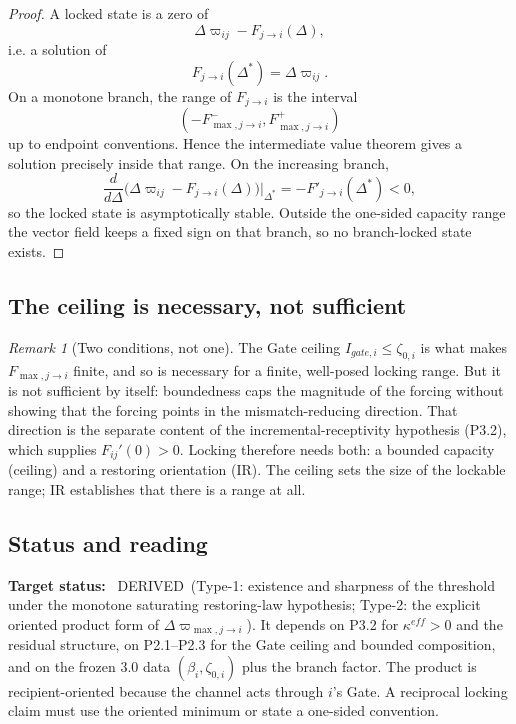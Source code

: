 \documentclass[11pt,a4paper]{article}
\def\mathrm#1{#1}%
\def\emph#1{#1}%
\newcommand{\stDerived}{\textcolor{cDer}{\textsf{\small DERIVED}}}
\theoremstyle{definition}
\theoremstyle{plain}
\theoremstyle{remark}
\newtheorem{remark}[definition]{Remark}
\begin{document}
\begin{proof}
A locked state is a zero of
\[
\Delta\varpi_{ij}-F_{j\to i}(\Delta),
\]
i.e. a solution of
\[
F_{j\to i}(\Delta^*)=\Delta\varpi_{ij}.
\]
On a monotone branch, the range of \(F_{j\to i}\) is the interval
\[
(-F^-_{\max,j\to i},F^+_{\max,j\to i})
\]
up to endpoint conventions. Hence the intermediate value theorem gives a solution
precisely inside that range. On the increasing branch,
\[
\frac{d}{d\Delta}
\bigl(\Delta\varpi_{ij}-F_{j\to i}(\Delta)\bigr)\big|_{\Delta^*}
=
-F'_{j\to i}(\Delta^*)<0,
\]
so the locked state is asymptotically stable. Outside the one-sided capacity
range the vector field keeps a fixed sign on that branch, so no branch-locked
state exists. \qedhere
\end{proof}

\subsection{The ceiling is necessary, not sufficient}

\begin{remark}[Two conditions, not one]\label{rem:ceilingnec}
The Gate ceiling \(I_{\mathrm{gate},i}\le\zeta_{0,i}\) is what makes \(F_{\max,j\to i}\) finite,
and so is \emph{necessary} for a finite, well-posed locking range. But it is not
\emph{sufficient} by itself: boundedness caps the magnitude of the forcing without showing
that the forcing points in the mismatch-reducing direction. That direction is the separate
content of the incremental-receptivity hypothesis (P3.2), which supplies \(F_{ij}'(0)>0\).
Locking therefore needs both: a bounded capacity (ceiling) \emph{and} a restoring
orientation (IR). The ceiling sets the \emph{size} of the lockable range; IR establishes
that there is a range at all.
\end{remark}

\subsection{Status and reading}

\textbf{Target status:}~
\stDerived\ (Type-1: existence and sharpness of the threshold under the monotone
saturating restoring-law hypothesis; Type-2: the explicit oriented product form of
\(\Delta\varpi_{\max,j\to i}\)). It depends on P3.2 for
\(\kappa^{\mathrm{eff}}>0\) and the residual structure, on P2.1--P2.3 for the Gate
ceiling and bounded composition, and on the frozen 3.0 data
\((\beta_i,\zeta_{0,i})\) plus the branch factor. The product is recipient-oriented
because the channel acts through \(i\)'s Gate. A reciprocal locking claim must use
the oriented minimum or state a one-sided convention.
\end{document}
